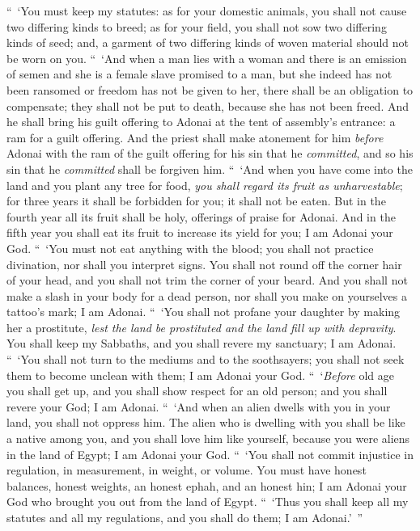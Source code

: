 \begin{biblechapter}
 “ ‘You must keep my statutes: as for your domestic animals, you shall not cause two differing kinds to breed; as for your field, you shall not sow two differing kinds of seed; and, a garment of two differing kinds of woven material should not be worn on you.
\verse “ ‘And when a man lies with a woman and there is an emission of semen and she is a female slave promised to a man, but she indeed has not been ransomed or freedom has not be given to her, there shall be an obligation to compensate; they shall not be put to death, because she has not been freed.
\verse And he shall bring his guilt offering to Adonai at the tent of assembly’s entrance: a ram for a guilt offering.
\verse And the priest shall make atonement for him \textit{before} Adonai with the ram of the guilt offering for his sin that he \textit{committed}, and so his sin that he \textit{committed} shall be forgiven him.
\verse “ ‘And when you have come into the land and you plant any tree for food, \textit{you shall regard its fruit as unharvestable}; for three years it shall be forbidden for you;  it shall not be eaten.
\verse But in the fourth year all its fruit shall be holy, offerings of praise for Adonai.
\verse And in the fifth year you shall eat its fruit to increase its yield for you;  I am Adonai your God.
\verse “ ‘You must not eat anything with the blood; you shall not practice divination, nor shall you interpret signs.
\verse You shall not round off the corner hair of your head, and you shall not trim the corner of your beard.
\verse And you shall not make a slash in your body for a dead person, nor shall you make on yourselves a tattoo’s mark; I am Adonai.
\verse “ ‘You shall not profane your daughter by making her a prostitute, \textit{lest the land be prostituted and the land fill up with depravity}.
\verse You shall keep my Sabbaths, and you shall revere my sanctuary; I am Adonai.
\verse “ ‘You shall not turn to the mediums and to the soothsayers; you shall not seek them to become unclean with them; I am Adonai your God.
\verse “ ‘\textit{Before} old age you shall get up, and you shall show respect for an old person; and you shall revere your God; I am Adonai.
\verse “ ‘And when an alien dwells with you in your land, you shall not oppress him.
\verse The alien who is dwelling with you shall be like a native among you, and you shall love him like yourself,  because you were aliens in the land of Egypt; I am Adonai your God.
\verse “ ‘You shall not commit injustice in regulation, in measurement, in weight, or volume.
\verse You must have honest balances, honest weights, an honest ephah, and an honest hin; I am Adonai your God who brought you out from the land of Egypt.
\verse “ ‘Thus you shall keep all my statutes and all my regulations, and you shall do them; I am Adonai.’ ”
\end{biblechapter}


